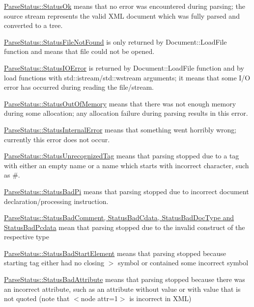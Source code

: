 \begin{DoxyItemize}
\item \hyperlink{namespaceMezzanine_1_1xml_a119489767bc2293563aef2066d960796}{ParseStatus::StatusOk} means that no error was encountered during parsing; the source stream represents the valid XML document which was fully parsed and converted to a tree.
\item \hyperlink{namespaceMezzanine_1_1xml_a119489767bc2293563aef2066d960796}{ParseStatus::StatusFileNotFound} is only returned by Document::LoadFile function and means that file could not be opened.
\item \hyperlink{namespaceMezzanine_1_1xml_a119489767bc2293563aef2066d960796}{ParseStatus::StatusIOError} is returned by Document::LoadFile function and by load functions with std::istream/std::wstream arguments; it means that some I/O error has occurred during reading the file/stream.
\item \hyperlink{namespaceMezzanine_1_1xml_a119489767bc2293563aef2066d960796}{ParseStatus::StatusOutOfMemory} means that there was not enough memory during some allocation; any allocation failure during parsing results in this error.
\item \hyperlink{namespaceMezzanine_1_1xml_a119489767bc2293563aef2066d960796}{ParseStatus::StatusInternalError} means that something went horribly wrong; currently this error does not occur.
\item \hyperlink{namespaceMezzanine_1_1xml_a119489767bc2293563aef2066d960796}{ParseStatus::StatusUnrecognizedTag} means that parsing stopped due to a tag with either an empty name or a name which starts with incorrect character, such as \#.
\item \hyperlink{namespaceMezzanine_1_1xml_a119489767bc2293563aef2066d960796}{ParseStatus::StatusBadPi} means that parsing stopped due to incorrect document declaration/processing instruction.
\item \hyperlink{namespaceMezzanine_1_1xml_a119489767bc2293563aef2066d960796}{ParseStatus::StatusBadComment, StatusBadCdata, StatusBadDocType and StatusBadPcdata} mean that parsing stopped due to the invalid construct of the respective type
\item \hyperlink{namespaceMezzanine_1_1xml_a119489767bc2293563aef2066d960796}{ParseStatus::StatusBadStartElement} means that parsing stopped because starting tag either had no closing $>$ symbol or contained some incorrect symbol
\item \hyperlink{namespaceMezzanine_1_1xml_a119489767bc2293563aef2066d960796}{ParseStatus::StatusBadAttribute} means that parsing stopped because there was an incorrect attribute, such as an attribute without value or with value that is not quoted (note that $<$node attr=1$>$ is incorrect in XML)

\end{DoxyItemize}
